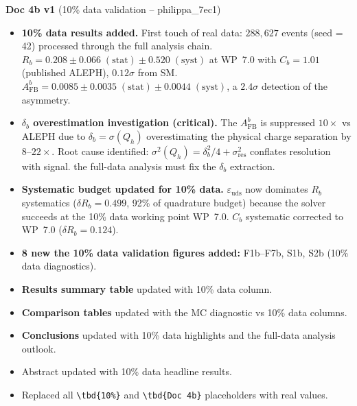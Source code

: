 \documentclass[11pt,a4paper]{article}
\begin{document}
\textbf{Doc 4b v1} (10\% data validation -- philippa\_7ec1)
\begin{itemize}
\item \textbf{10\% data results added.} First touch of real data: $288{,}627$ events
  (seed = 42) processed through the full analysis chain. $R_b = 0.208 \pm 0.066\;\mathrm{(stat)}
  \pm 0.520\;\mathrm{(syst)}$ at WP~7.0 with $C_b = 1.01$ (published ALEPH),
  $0.12\sigma$ from SM. $A_\mathrm{FB}^b = 0.0085 \pm 0.0035\;\mathrm{(stat)}
  \pm 0.0044\;\mathrm{(syst)}$, a $2.4\sigma$ detection of the asymmetry.
\item \textbf{$\delta_b$ overestimation investigation (critical).} The $A_\mathrm{FB}^b$
  is suppressed $10\times$ vs ALEPH due to $\delta_b = \sigma(Q_h)$ overestimating the
  physical charge separation by $8$--$22\times$. Root cause identified:
  $\sigma^2(Q_h) = \delta_b^2/4 + \sigma_\mathrm{res}^2$ conflates resolution with
  signal. the full-data analysis must fix the $\delta_b$ extraction.
\item \textbf{Systematic budget updated for 10\% data.} $\varepsilon_\mathrm{uds}$
  now dominates $R_b$ systematics ($\delta R_b = 0.499$, 92\% of quadrature budget) because
  the solver succeeds at the 10\% data working point WP~7.0. $C_b$ systematic
  corrected to WP~7.0 ($\delta R_b = 0.124$).
\item \textbf{8 new the 10\% data validation figures added:} F1b--F7b, S1b, S2b (10\% data diagnostics).
\item \textbf{Results summary table} updated with 10\% data column.
\item \textbf{Comparison tables} updated with the MC diagnostic vs 10\% data columns.
\item \textbf{Conclusions} updated with 10\% data highlights and the full-data analysis outlook.
\item Abstract updated with 10\% data headline results.
\item Replaced all \texttt{\textbackslash tbd\{10\%\}} and \texttt{\textbackslash tbd\{Doc 4b\}}
  placeholders with real values.
\end{itemize}
\end{document}
